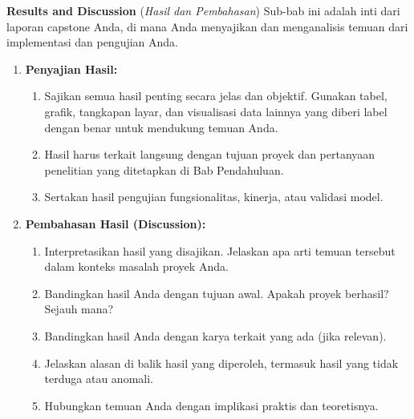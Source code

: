 \documentclass{elsinta}
\begin{document}
\textbf{Results and Discussion} (\textit{Hasil dan Pembahasan})
Sub-bab ini adalah inti dari laporan capstone Anda, di mana Anda menyajikan dan menganalisis temuan dari implementasi dan pengujian Anda.
\begin{enumerate}
    \item \textbf{Penyajian Hasil:}
    \begin{enumerate}
        \item Sajikan semua hasil penting secara jelas dan objektif. Gunakan tabel, grafik, tangkapan layar, dan visualisasi data lainnya yang diberi label dengan benar untuk mendukung temuan Anda.
        \item Hasil harus terkait langsung dengan tujuan proyek dan pertanyaan penelitian yang ditetapkan di Bab Pendahuluan.
        \item Sertakan hasil pengujian fungsionalitas, kinerja, atau validasi model.
    \end{enumerate}
    \item \textbf{Pembahasan Hasil (Discussion):}
    \begin{enumerate}
        \item Interpretasikan hasil yang disajikan. Jelaskan apa arti temuan tersebut dalam konteks masalah proyek Anda.
        \item Bandingkan hasil Anda dengan tujuan awal. Apakah proyek berhasil? Sejauh mana?
        \item Bandingkan hasil Anda dengan karya terkait yang ada (jika relevan).
        \item Jelaskan alasan di balik hasil yang diperoleh, termasuk hasil yang tidak terduga atau anomali.
        \item Hubungkan temuan Anda dengan implikasi praktis dan teoretisnya.
    \end{enumerate}
\end{enumerate}

\vspace{0.5cm}

\subsection{\ProblemsSolutionsTitle}
\label{sec:problems_and_solutions}
\end{document}
